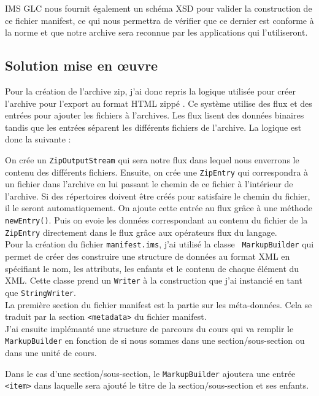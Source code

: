 IMS GLC nous fournit également un schéma XSD pour valider la construction de ce
fichier manifest, ce qui nous permettra de vérifier que ce dernier est conforme
à la norme et que notre archive sera reconnue par les applications qui
l'utiliseront.

\subsection{Solution mise en \oe uvre}
Pour la création de l'archive zip, j'ai donc repris la logique utilisée pour
créer l'archive pour l'export au format HTML \og zippé \fg{}. Ce système utilise
des flux et des entrées pour ajouter les fichiers à l'archives. Les flux lisent
des données binaires tandis que les entrées séparent les différents fichiers de
l'archive. La logique est donc la suivante : 

On crée un {\tt ZipOutputStream}
qui sera notre flux dans lequel nous enverrons le contenu des différents
fichiers. Ensuite, on crée une {\tt ZipEntry} qui correspondra à un fichier dans
l'archive en lui passant le chemin de ce fichier à l'intérieur de l'archive. Si
des répertoires doivent être créés pour satisfaire le chemin du fichier, il le
seront automatiquement. On ajoute cette entrée au flux grâce à une méthode
{\tt newEntry()}. Puis on evoie les données correspondant au contenu du
fichier de la {\tt ZipEntry} directement dans le flux grâce aux opérateurs
flux du langage.\\

Pour la création du fichier {\tt manifest.ims}, j'ai utilisé la classe {\tt
MarkupBuilder} qui permet de créer des construire une structure de données au
format XML en spécifiant le nom, les attributs, les enfants et le contenu de
chaque élément du XML. Cette classe prend un {\tt Writer} à la construction que
j'ai instancié en tant que {\tt StringWriter}.\\

La première section du fichier manifest est la partie sur les méta-données. Cela
se traduit par la section {\tt <metadata>} du fichier manifest.\\

J'ai ensuite implémanté une structure de parcours du cours qui va remplir le
{\tt MarkupBuilder} en fonction de si nous sommes dans une section/sous-section
ou dans une unité de cours. 

Dans le cas d'une section/sous-section, le {\tt MarkupBuilder} ajoutera une
entrée {\tt <item>} dans laquelle sera ajouté le titre de la
section/sous-section et ses enfants.

